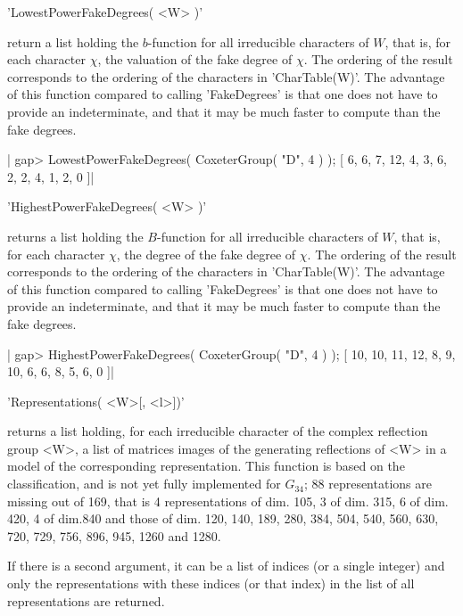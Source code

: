 'LowestPowerFakeDegrees( <W> )'

return a list holding the $b$-function for all irreducible characters of
$W$,  that is,  for each  character $\chi$,  the valuation  of the  fake
degree of $\chi$. The ordering of the result corresponds to the ordering
of  the characters  in 'CharTable(W)'.  The advantage  of this  function
compared to calling  'FakeDegrees' is that one does not  have to provide
an indeterminate,  and that it  may be much  faster to compute  than the
fake degrees.

|    gap> LowestPowerFakeDegrees( CoxeterGroup( "D", 4 ) );
    [ 6, 6, 7, 12, 4, 3, 6, 2, 2, 4, 1, 2, 0 ]|


'HighestPowerFakeDegrees( <W> )'

returns a list  holding the $B$-function for  all irreducible characters
of  $W$, that  is, for  each character  $\chi$, the  degree of  the fake
degree of $\chi$. The ordering of the result corresponds to the ordering
of  the characters  in 'CharTable(W)'.  The advantage  of this  function
compared to calling  'FakeDegrees' is that one does not  have to provide
an indeterminate,  and that it  may be much  faster to compute  than the
fake degrees.

|    gap> HighestPowerFakeDegrees( CoxeterGroup( "D", 4 ) );
    [ 10, 10, 11, 12, 8, 9, 10, 6, 6, 8, 5, 6, 0 ]|


'Representations( <W>[, <l>])'

returns  a  list  holding,  for  each  irreducible character of the complex
reflection  group  <W>,  a  list  of  matrices  images  of  the  generating
reflections  of <W>  in a  model of  the corresponding representation. This
function  is based on the classification,  and is not yet fully implemented
for  $G_{34}$;  88  representations  are  missing  out  of  169,  that is 4
representations of dim. 105, 3 of dim. 315, 6 of dim. 420, 4 of dim.840 and
those  of dim. 120, 140, 189, 280, 384,  504, 540, 560, 630, 720, 729, 756,
896, 945, 1260 and 1280.

If  there is a  second argument, it  can be a  list of indices (or a single
integer) and only the representations with these indices (or that index) in
the list of all representations are returned.

